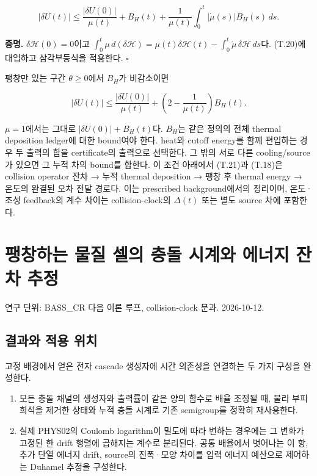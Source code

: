\documentclass[11pt,a4paper]{article}
\providecommand{\tightlist}{\setlength{\itemsep}{2pt}\setlength{\parskip}{0pt}}
\begin{document}
\[
\boxed{
|\delta U(t)|\le
\frac{|\delta U(0)|}{\mu(t)}
+B_H(t)+\frac1{\mu(t)}
\int_0^t|\dot\mu(s)|B_H(s)\,ds .
}
\tag{T.21}
\]

\textbf{증명.} \(\delta\mathcal H(0)=0\)이고 \(\int_0^t\mu\,d(\delta\mathcal H) =\mu(t)\delta\mathcal H(t)-\int_0^t\dot\mu\,\delta\mathcal H\,ds\)다. (T.20)에 대입하고 삼각부등식을 적용한다. \(\square\)

팽창만 있는 구간 \(\theta\ge0\)에서 \(B_H\)가 비감소이면

\[
|\delta U(t)|\le
\frac{|\delta U(0)|}{\mu(t)}
+\left(2-\frac1{\mu(t)}\right)B_H(t).
\tag{T.22}
\]

\(\mu=1\)에서는 그대로 \(|\delta U(0)|+B_H(t)\)다. \(B_H\)는 같은 정의의 전체 thermal deposition ledger에 대한 bound여야 한다. heat와 cutoff energy를 함께 편입하는 경우 두 출력의 합을 certificate의 출력으로 선택한다. 그 밖의 서로 다른 cooling/source가 있으면 그 누적 차의 bound를 합한다. 이 조건 아래에서 (T.21)과 (T.18)은 collision operator 잔차 → 누적 thermal deposition → 팽창 후 thermal energy → 온도의 완결된 오차 전달 경로다. 이는 prescribed background에서의 정리이며, 온도·조성 feedback의 계수 차이는 collision-clock의 \(\Delta(t)\) 또는 별도 source 차에 포함한다.

\clearpage

\hypertarget{uxd33duxcc3duxd558uxb294-uxbb3cuxc9c8-uxc140uxc758-uxcda9uxb3cc-uxc2dcuxacc4uxc640-uxc5d0uxb108uxc9c0-uxc794uxcc28-uxcd94uxc815}{%
\section{팽창하는 물질 셀의 충돌 시계와 에너지 잔차 추정}\label{uxd33duxcc3duxd558uxb294-uxbb3cuxc9c8-uxc140uxc758-uxcda9uxb3cc-uxc2dcuxacc4uxc640-uxc5d0uxb108uxc9c0-uxc794uxcc28-uxcd94uxc815}}

연구 단위: BASS\_CR 다음 이론 루프, collision-clock 분과. 2026-10-12.

\hypertarget{uxacb0uxacfcuxc640-uxc801uxc6a9-uxc704uxce58}{%
\subsection{결과와 적용 위치}\label{uxacb0uxacfcuxc640-uxc801uxc6a9-uxc704uxce58}}

고정 배경에서 얻은 전자 cascade 생성자에 시간 의존성을 연결하는 두 가지 구성을 완성한다.

\begin{enumerate}
\def\labelenumi{\arabic{enumi}.}
\tightlist
\item
  모든 충돌 채널의 생성자와 출력률이 같은 양의 함수로 배율 조정될 때, 물리 부피 희석을 제거한 상태와 누적 충돌 시계로 기존 semigroup를 정확히 재사용한다.
\item
  실제 PHYS02의 Coulomb logarithm이 밀도에 따라 변하는 경우에는 그 변화가 고정된 한 drift 행렬에 곱해지는 계수로 분리된다. 공통 배율에서 벗어나는 이 항, 추가 단열 에너지 drift, source의 진폭·모양 차이를 입력 에너지 예산으로 제어하는 Duhamel 추정을 구성한다.
\end{enumerate}
\end{document}
